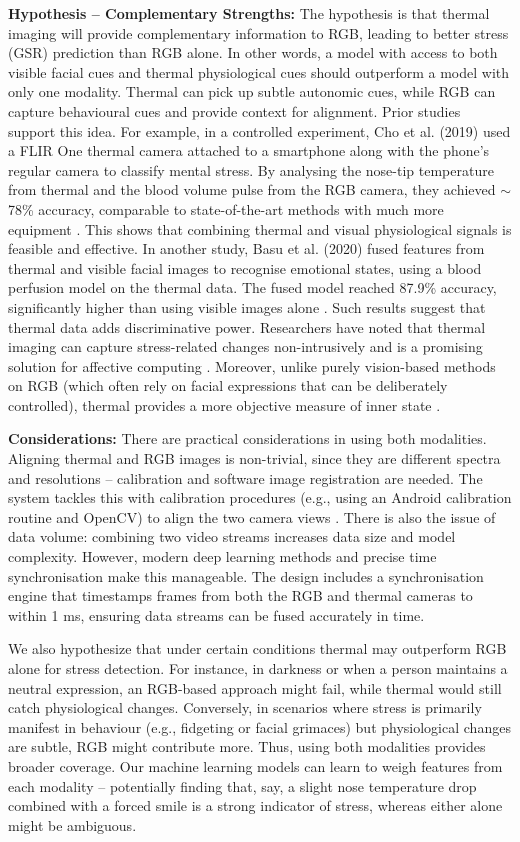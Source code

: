 \textbf{Hypothesis -- Complementary Strengths:} The hypothesis is that thermal imaging will provide complementary information to RGB, leading to better stress (GSR) prediction than RGB alone. In other words, a model with access to both visible facial cues and thermal physiological cues should outperform a model with only one modality. Thermal can pick up subtle autonomic cues, while RGB can capture behavioural cues and provide context for alignment. Prior studies support this idea. For example, in a controlled experiment, Cho et al. (2019) used a FLIR One thermal camera attached to a smartphone along with the phone's regular camera to classify mental stress. By analysing the nose-tip temperature from thermal and the blood volume pulse from the RGB camera, they achieved $\sim$78\% accuracy, comparable to state-of-the-art methods with much more equipment \cite{ref5}. This shows that combining thermal and visual physiological signals is feasible and effective. In another study, Basu et al. (2020) fused features from thermal and visible facial images to recognise emotional states, using a blood perfusion model on the thermal data. The fused model reached 87.9\% accuracy, significantly higher than using visible images alone \cite{ref5}. Such results suggest that thermal data adds discriminative power. Researchers have noted that thermal imaging can capture stress-related changes non-intrusively and is a promising solution for affective computing \cite{ref10}. Moreover, unlike purely vision-based methods on RGB (which often rely on facial expressions that can be deliberately controlled), thermal provides a more objective measure of inner state \cite{ref5}.

\textbf{Considerations:} There are practical considerations in using both modalities. Aligning thermal and RGB images is non-trivial, since they are different spectra and resolutions -- calibration and software image registration are needed. The system tackles this with calibration procedures (e.g., using an Android calibration routine and OpenCV) to align the two camera views \cite{ref22}. There is also the issue of data volume: combining two video streams increases data size and model complexity. However, modern deep learning methods and precise time synchronisation make this manageable. The design includes a synchronisation engine that timestamps frames from both the RGB and thermal cameras to within 1 ms, ensuring data streams can be fused accurately in time.

We also hypothesize that under certain conditions thermal may outperform RGB alone for stress detection. For instance, in darkness or when a person maintains a neutral expression, an RGB-based approach might fail, while thermal would still catch physiological changes. Conversely, in scenarios where stress is primarily manifest in behaviour (e.g., fidgeting or facial grimaces) but physiological changes are subtle, RGB might contribute more. Thus, using both modalities provides broader coverage. Our machine learning models can learn to weigh features from each modality -- potentially finding that, say, a slight nose temperature drop combined with a forced smile is a strong indicator of stress, whereas either alone might be ambiguous.

